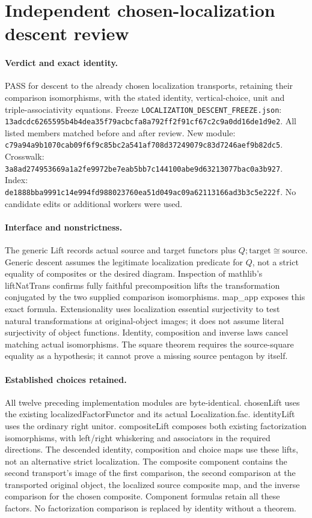 \documentclass{article}
\begin{document}
\section*{Independent chosen-localization descent review}
\paragraph{Verdict and exact identity.} PASS for descent to the already chosen localization transports, retaining their comparison isomorphisms, with the stated identity, vertical-choice, unit and triple-associativity equations. Freeze \texttt{LOCALIZATION\_DESCENT\_FREEZE.json}: \texttt{13adcdc6265595b4b4dea35f79acbcfa8a792ff2f91cf67c2c9a0dd16de1d9e2}. All listed members matched before and after review. New module: \texttt{c79a94a9b1070cab09f6f9c85bc2a541af708d37249079c83d7246aef9b82dc5}. Crosswalk: \texttt{3a8ad274953669a1a2fe9972be7eab5bb7c144100abe9d63213077bac0a3b927}. Index: \texttt{de1888bba9991c14e994fd988023760ea51d049ac09a62113166ad3b3c5e222f}. No candidate edits or additional workers were used.
\paragraph{Interface and nonstrictness.} The generic Lift records actual source and target functors plus $Q;\mathrm{target}\cong\mathrm{source}$. Generic descent assumes the legitimate localization predicate for $Q$, not a strict equality of composites or the desired diagram. Inspection of mathlib's liftNatTrans confirms fully faithful precomposition lifts the transformation conjugated by the two supplied comparison isomorphisms. map\_app exposes this exact formula. Extensionality uses localization essential surjectivity to test natural transformations at original-object images; it does not assume literal surjectivity of object functions. Identity, composition and inverse laws cancel matching actual isomorphisms. The square theorem requires the source-square equality as a hypothesis; it cannot prove a missing source pentagon by itself.
\paragraph{Established choices retained.} All twelve preceding implementation modules are byte-identical. chosenLift uses the existing localizedFactorFunctor and its actual Localization.fac. identityLift uses the ordinary right unitor. compositeLift composes both existing factorization isomorphisms, with left/right whiskering and associators in the required directions. The descended identity, composition and choice maps use these lifts, not an alternative strict localization. The composite component contains the second transport's image of the first comparison, the second comparison at the transported original object, the localized source composite map, and the inverse comparison for the chosen composite. Component formulas retain all these factors. No factorization comparison is replaced by identity without a theorem.
\end{document}
